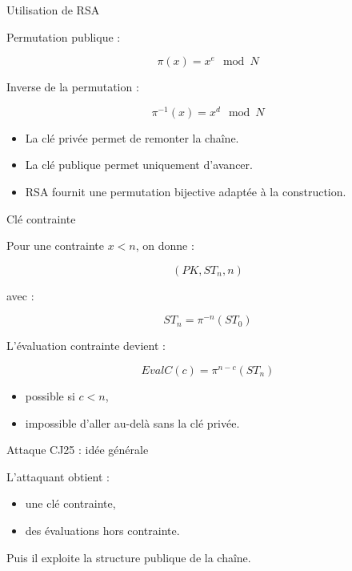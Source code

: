 \documentclass{beamer}
\begin{document}
\begin{frame}{Utilisation de RSA}

Permutation publique :

\[
\pi(x)=x^e \mod N
\]

\vspace{0.4cm}

Inverse de la permutation :

\[
\pi^{-1}(x)=x^d \mod N
\]

\vspace{0.5cm}

\begin{itemize}
    \item La clé privée permet de remonter la chaîne.
    \item La clé publique permet uniquement d’avancer.
    \item RSA fournit une permutation bijective adaptée à la construction.
\end{itemize}

\end{frame}

\begin{frame}{Clé contrainte}

Pour une contrainte \(x < n\), on donne :

\[
(PK, ST_n, n)
\]

\vspace{0.5cm}

avec :

\[
ST_n=\pi^{-n}(ST_0)
\]

\vspace{0.5cm}

L’évaluation contrainte devient :

\[
EvalC(c)=\pi^{n-c}(ST_n)
\]

\vspace{0.5cm}

\begin{itemize}
    \item possible si \(c<n\),
    \item impossible d’aller au-delà sans la clé privée.
\end{itemize}

\end{frame}

\begin{frame}{Attaque CJ25 : idée générale}

L’attaquant obtient :
\begin{itemize}
    \item une clé contrainte,
    \item des évaluations hors contrainte.
\end{itemize}

\vspace{0.4cm}

Puis il exploite la structure publique de la chaîne.


\end{frame}
\end{document}
